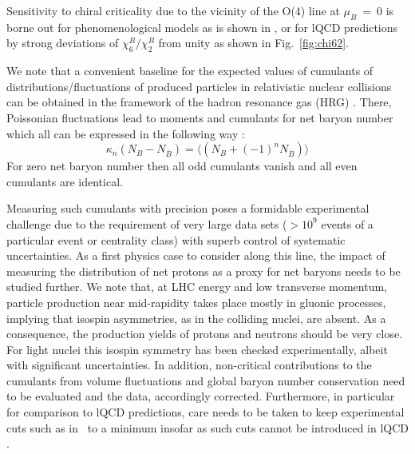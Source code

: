 Sensitivity to chiral criticality due to the vicinity of the O(4) line at $\mu_B~=~0$ is borne out for phenomenological models as is shown in \cite{Friman:2011pf,Almasi:2017bhq}, or for lQCD predictions \cite{Bazavov:2017dus,Borsanyi:2018grb} by strong deviations of $\chi_6^B/\chi_2^B$ from unity as shown in Fig.~\ref{fig:chi62}.

We note that a convenient baseline for the expected values of cumulants of distributions/fluctuations of produced particles in relativistic nuclear collisions can be obtained in the framework of the hadron re\-so\-nance gas (HRG) \cite{Allton:2005gk,Karsch:2010ck,BraunMunzinger:2011ta,Borsanyi:2018grb,Luo:2017faz}. There, Poissonian fluctuations lead to moments and cumulants for net baryon number which all can be expressed in the following way \cite{BraunMunzinger:2011ta,BraunMunzinger:2011dn, Braun-Munzinger:2018yru}:
\begin{equation}
\label{lbaseline}
\kappa_n(N_B - N_{\overline{B}}) = \langle (N_B +(-1)^n N_{\overline{B}}) \rangle
\end{equation}
For zero net baryon number then all odd cumulants vanish and all even cumulants are identical.

Measuring such cumulants with precision poses a formidable experimental challenge due to the requirement of very large data sets ($> 10^9$ events of a particular event or centrality class) with superb control of systematic uncertainties. As a first physics case to consider along this line, the impact of measuring the distribution of net protons as a proxy for net baryons needs to be studied further. We note that, at LHC energy and low transverse momentum, particle production near mid-rapidity takes place mostly in gluonic processes, implying that isospin asymmetries, as in the colliding nuclei, are absent. As a consequence, the production yields of protons and neutrons should be very close. For light nuclei this isospin symmetry has been checked experimentally, albeit with significant uncertainties. 
In addition, non-critical contributions to the cumulants from volume fluctuations and global baryon number conservation \cite{Skokov:2012ds,Braun-Munzinger:2016yjz, Braun-Munzinger:2018yru} need to be evaluated and the data, accordingly corrected. Furthermore, in particular for comparison to lQCD predictions, care needs to be taken to keep experimental cuts such as in \pT\ to a minimum insofar as such cuts cannot be introduced in lQCD \cite{Karsch:2015zna,Alba:2015iva}.
     
